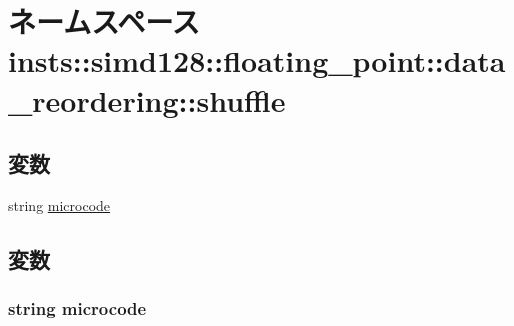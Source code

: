 \hypertarget{namespaceinsts_1_1simd128_1_1floating__point_1_1data__reordering_1_1shuffle}{
\section{ネームスペース insts::simd128::floating\_\-point::data\_\-reordering::shuffle}
\label{namespaceinsts_1_1simd128_1_1floating__point_1_1data__reordering_1_1shuffle}
}
\subsection*{変数}
\begin{DoxyCompactItemize}
\item 
string \hyperlink{namespaceinsts_1_1simd128_1_1floating__point_1_1data__reordering_1_1shuffle_a770f11a173e99389a8802f0107ed8f52}{microcode}
\end{DoxyCompactItemize}


\subsection{変数}
\hypertarget{namespaceinsts_1_1simd128_1_1floating__point_1_1data__reordering_1_1shuffle_a770f11a173e99389a8802f0107ed8f52}{
\subsubsection[{microcode}]{\setlength{\rightskip}{0pt plus 5cm}string {\bf microcode}}}
\label{namespaceinsts_1_1simd128_1_1floating__point_1_1data__reordering_1_1shuffle_a770f11a173e99389a8802f0107ed8f52}
